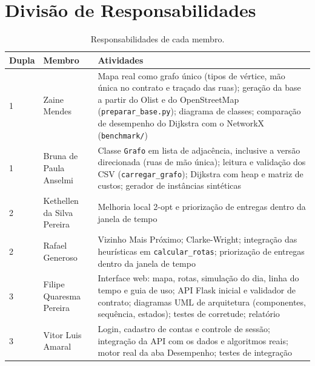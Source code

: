 \documentclass[12pt]{article}
\begin{document}
\needspace{.45\textheight}
\section{Divisão de Responsabilidades}

\begin{table}[H]
\centering
\caption{Responsabilidades de cada membro.}
\label{tab:responsabilidades}
\small
\begin{tabular}{llp{8.2cm}}
\toprule
Dupla & Membro & Atividades \\
\midrule
1 & Zaine Mendes & Mapa real como grafo único (tipos de vértice, mão única no contrato e traçado das ruas); geração da base a partir do Olist e do OpenStreetMap (\texttt{preparar\_base.py}); diagrama de classes; comparação de desempenho do Dijkstra com o NetworkX (\texttt{benchmark/}) \\
1 & Bruna de Paula Anselmi & Classe \texttt{Grafo} em lista de adjacência, inclusive a versão direcionada (ruas de mão única); leitura e validação dos CSV (\texttt{carregar\_grafo}); Dijkstra com heap e matriz de custos; gerador de instâncias sintéticas \\
2 & Kethellen da Silva Pereira & Melhoria local 2-opt e priorização de entregas dentro da janela de tempo \\
2 & Rafael Generoso & Vizinho Mais Próximo; Clarke-Wright; integração das heurísticas em \texttt{calcular\_rotas}; priorização de entregas dentro da janela de tempo \\
3 & Filipe Quaresma Pereira & Interface web: mapa, rotas, simulação do dia, linha do tempo e guia de uso; API Flask inicial e validador de contrato; diagramas UML de arquitetura (componentes, sequência, estados); testes de corretude; relatório \\
3 & Vitor Luis Amaral & Login, cadastro de contas e controle de sessão; integração da API com os dados e algoritmos reais; motor real da aba Desempenho; testes de integração \\
\bottomrule
\end{tabular}
\end{table}

\FloatBarrier


\end{document}
